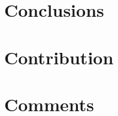 \documentclass[12pt,twocolumn]{article}
\begin{document}
\section{Conclusions}
    \label{sec:conclusions}
    
    
\clearpage



\begin{appendices}
\section{Contribution}
    \label{sec:contribution}
    
\section{Comments}
    \label{sec:comments}
    
\end{appendices}

%

\end{document}
